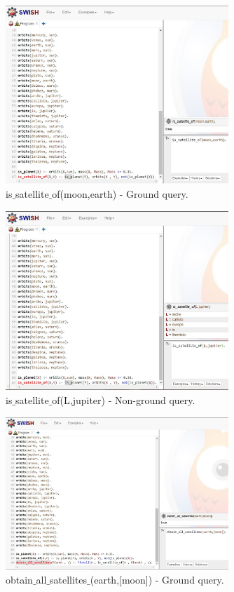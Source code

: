 \documentclass[12pt]{article}
\begin{document}
\begin{enumerate}
	\begin{figure}[htbp]
		\centering
		\includegraphics[width=0.75\textwidth]{is-satellite-of_G.JPG}
		\caption{is$\_$satellite$\_$of(moon,earth) - Ground query.}
	\end{figure}
	
	\begin{figure}[htbp]
		\centering
		\includegraphics[width=0.75\textwidth]{is-satellite-of_NG.JPG}
		\caption{is$\_$satellite$\_$of(L,jupiter) - Non-ground query.}
	\end{figure}
		
	\begin{figure}[htbp]
		\centering
		\includegraphics[width=0.75\textwidth]{obtain-all-satellites_G.JPG}
		\caption{obtain$\_$all$\_$satellites$\_$(earth,[moon]) - Ground query.}
	\end{figure}
	

\end{enumerate}
\end{document}
